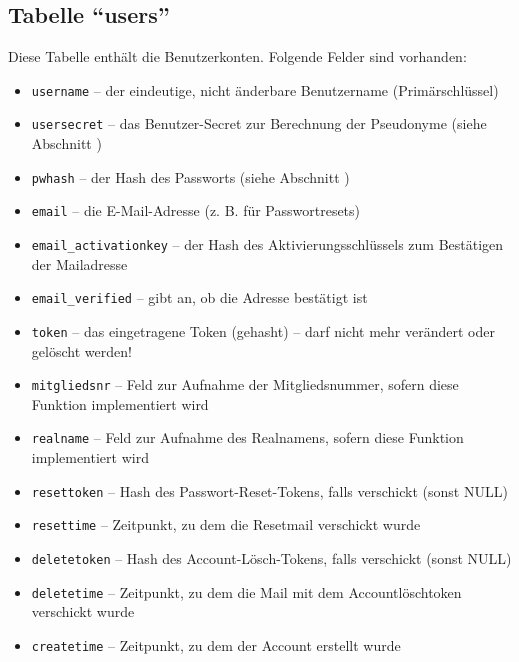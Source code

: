 \subsection{Tabelle "`users"'}
Diese Tabelle enthält die Benutzerkonten. Folgende Felder sind vorhanden:
\begin{itemize}
	\item \texttt{username} -- der eindeutige, nicht änderbare Benutzername (Primärschlüssel)
	\item \texttt{usersecret} -- das Benutzer-Secret zur Berechnung der Pseudonyme (siehe Abschnitt )
	\item \texttt{pwhash} -- der Hash des Passworts (siehe Abschnitt )
	\item \texttt{email} -- die E-Mail-Adresse (z. B. für Passwortresets)
	\item \texttt{email\_activationkey} -- der Hash des Aktivierungsschlüssels zum Bestätigen der Mailadresse
	\item \texttt{email\_verified} -- gibt an, ob die Adresse bestätigt ist
	\item \texttt{token} -- das eingetragene Token (gehasht) -- darf nicht mehr verändert oder gelöscht werden!
	\item \texttt{mitgliedsnr} -- Feld zur Aufnahme der Mitgliedsnummer, sofern diese Funktion implementiert wird
	\item \texttt{realname} -- Feld zur Aufnahme des Realnamens, sofern diese Funktion implementiert wird
	\item \texttt{resettoken} -- Hash des Passwort-Reset-Tokens, falls verschickt (sonst NULL)
	\item \texttt{resettime} -- Zeitpunkt, zu dem die Resetmail verschickt wurde
	\item \texttt{deletetoken} -- Hash des Account-Lösch-Tokens, falls verschickt (sonst NULL)
	\item \texttt{deletetime} -- Zeitpunkt, zu dem die Mail mit dem Accountlöschtoken verschickt wurde
	\item \texttt{createtime} -- Zeitpunkt, zu dem der Account erstellt wurde
\end{itemize}


